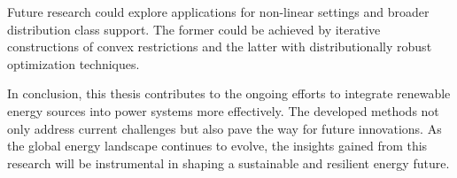 Future research could explore applications for non-linear settings and broader distribution class support. The former could be achieved by iterative constructions of convex restrictions and the latter with distributionally robust optimization techniques. 



In conclusion, this thesis contributes to the ongoing efforts to integrate renewable energy sources into power systems more effectively. The developed methods not only address current challenges but also pave the way for future innovations. As the global energy landscape continues to evolve, the insights gained from this research will be instrumental in shaping a sustainable and resilient energy future.




